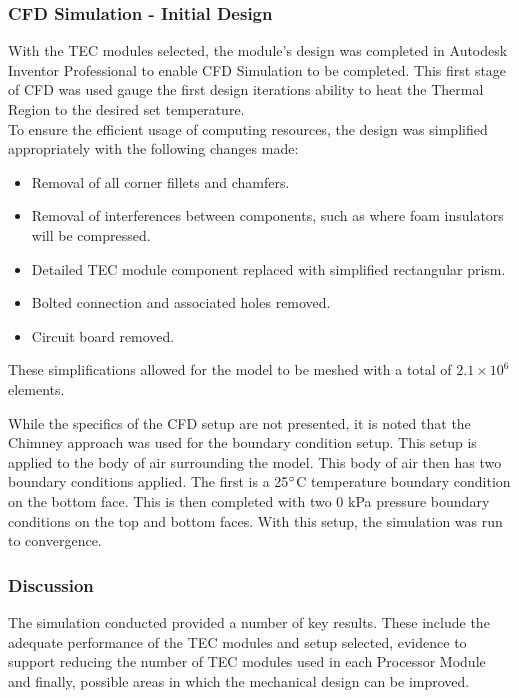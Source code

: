 \subsubsection{CFD Simulation - Initial Design}
\label{initialcfd}

With the TEC modules selected, the module's design was completed in Autodesk Inventor Professional to enable CFD Simulation to be completed. This first stage of CFD was used gauge the first design iterations ability to heat the Thermal Region to the desired set temperature.\\

To ensure the efficient usage of computing resources, the design was simplified appropriately with the following changes made:
\begin{itemize}
	\item Removal of all corner fillets and chamfers.
	\item Removal of interferences between components, such as where foam insulators will be compressed.
	\item Detailed TEC module component replaced with simplified rectangular prism.
	\item Bolted connection and associated holes removed.
	\item Circuit board removed.
\end{itemize}

These simplifications allowed for the model to be meshed with a total of $2.1\times 10^6$ elements.

While the specifics of the CFD setup are not presented, it is noted that the Chimney approach was used for the boundary condition setup. This setup is applied to the body of air surrounding the model. This body of air then has two boundary conditions applied. The first is a 25$\degree$C temperature boundary condition on the bottom face. This is then completed with two 0 kPa pressure boundary conditions on the top and bottom faces. With this setup, the simulation was run to convergence.\\

\subsubsection{Discussion}

The simulation conducted provided a number of key results. These include the adequate performance of the TEC modules and setup selected, evidence to support reducing the number of TEC modules used in each Processor Module and finally, possible areas in which the mechanical design can be improved.\\

